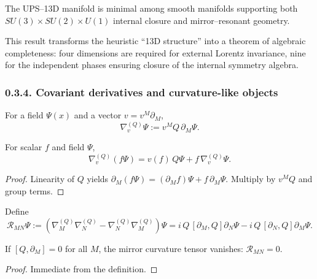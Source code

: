 \begin{corollary}
The UPS–13D manifold is minimal among smooth manifolds supporting both $SU(3)\times SU(2)\times U(1)$ internal closure and mirror–resonant geometry.
\end{corollary}

\begin{remark}
This result transforms the heuristic “13D structure” into a theorem of algebraic completeness:
four dimensions are required for external Lorentz invariance, nine for the independent phases ensuring closure of the internal symmetry algebra.
\end{remark}

\subsubsection*{0.3.4. Covariant derivatives and curvature-like objects}

\begin{definition}
For a field $\Psi(x)$ and a vector $v=v^M\partial_M$,
\[
\nabla^{(Q)}_v \Psi := v^M Q\,\partial_M\Psi.
\]
\end{definition}

\begin{lemma}
For scalar $f$ and field $\Psi$,
\[
\nabla^{(Q)}_v (f\Psi)
= v(f)\,Q\Psi + f\,\nabla^{(Q)}_v\Psi.
\]
\end{lemma}

\begin{proof}
Linearity of $Q$ yields $\partial_M(f\Psi)=(\partial_M f)\Psi+f\,\partial_M\Psi$.
Multiply by $v^M Q$ and group terms.
\end{proof}

\begin{definition}
Define
\[
\mathcal{R}_{MN}\Psi
:=
(\nabla^{(Q)}_M\nabla^{(Q)}_N
-\nabla^{(Q)}_N\nabla^{(Q)}_M)\Psi
=i\,Q\,[\partial_M,Q]\partial_N\Psi - i\,Q\,[\partial_N,Q]\partial_M\Psi.
\]
\end{definition}

\begin{proposition}
If $[Q,\partial_M]=0$ for all $M$, the mirror curvature tensor vanishes:
$\mathcal{R}_{MN}=0$.
\end{proposition}

\begin{proof}
Immediate from the definition.
\end{proof}

